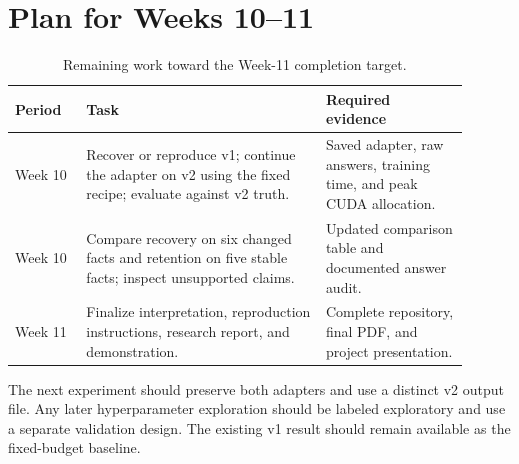 \documentclass[10pt,letterpaper]{article}
\begin{document}
\section{Plan for Weeks 10--11}
\begin{table}[htbp]\centering\small
\caption{Remaining work toward the Week-11 completion target.}
\begin{tabular}{P{0.14\linewidth}P{0.47\linewidth}P{0.29\linewidth}}\toprule
Period & Task & Required evidence\\\midrule
Week 10 & Recover or reproduce v1; continue the adapter on v2 using the fixed recipe; evaluate against v2 truth. & Saved adapter, raw answers, training time, and peak CUDA allocation.\\
Week 10 & Compare recovery on six changed facts and retention on five stable facts; inspect unsupported claims. & Updated comparison table and documented answer audit.\\
Week 11 & Finalize interpretation, reproduction instructions, research report, and demonstration. & Complete repository, final PDF, and project presentation.\\\bottomrule
\end{tabular}
\end{table}

The next experiment should preserve both adapters and use a distinct v2 output file. Any later hyperparameter exploration should be labeled exploratory and use a separate validation design. The existing v1 result should remain available as the fixed-budget baseline.

\clearpage
\appendix
\end{document}
